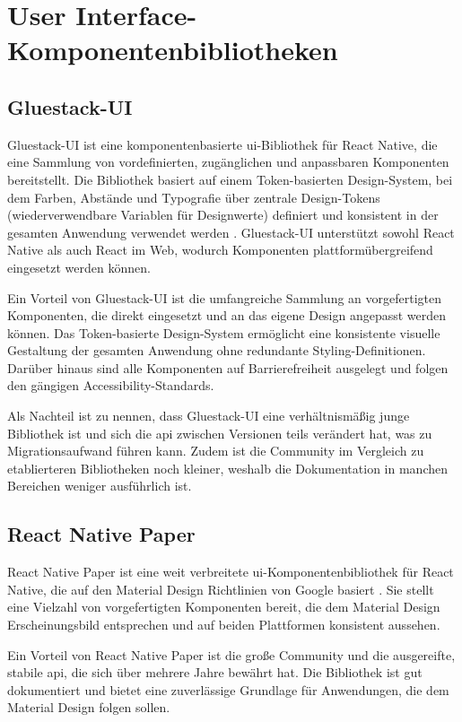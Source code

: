 \section{User Interface-Komponentenbibliotheken}

\subsection{Gluestack-UI}

Gluestack-UI ist eine komponentenbasierte \gls{ui}-Bibliothek für React 
Native, die eine Sammlung von vordefinierten, zugänglichen und 
anpassbaren Komponenten bereitstellt. Die Bibliothek basiert auf 
einem Token-basierten Design-System, bei dem Farben, Abstände und 
Typografie über zentrale Design-Tokens (wiederverwendbare Variablen für Designwerte) definiert und konsistent in 
der gesamten Anwendung verwendet werden \cite{gluestack-docs}. 
Gluestack-UI unterstützt sowohl React Native als auch React im Web, 
wodurch Komponenten plattformübergreifend eingesetzt werden können.

Ein Vorteil von Gluestack-UI ist die umfangreiche Sammlung an 
vorgefertigten Komponenten, die direkt eingesetzt und an das 
eigene Design angepasst werden können. Das Token-basierte 
Design-System ermöglicht eine konsistente visuelle Gestaltung 
der gesamten Anwendung ohne redundante Styling-Definitionen. 
Darüber hinaus sind alle Komponenten auf Barrierefreiheit 
ausgelegt und folgen den gängigen Accessibility-Standards.

Als Nachteil ist zu nennen, dass Gluestack-UI eine verhältnismäßig 
junge Bibliothek ist und sich die \gls{api} zwischen Versionen teils 
verändert hat, was zu Migrationsaufwand führen kann. 
Zudem ist die Community im Vergleich zu etablierteren Bibliotheken noch kleiner, weshalb die Dokumentation 
in manchen Bereichen weniger ausführlich ist.

\subsection{React Native Paper}

React Native Paper ist eine weit verbreitete \gls{ui}-Komponentenbibliothek 
für React Native, die auf den Material Design Richtlinien von Google 
basiert \cite{react-native-paper-docs}. Sie stellt eine Vielzahl 
von vorgefertigten Komponenten bereit, die dem Material Design 
Erscheinungsbild entsprechen und auf beiden Plattformen konsistent 
aussehen.

Ein Vorteil von React Native Paper ist die große Community und die 
ausgereifte, stabile \gls{api}, die sich über mehrere Jahre bewährt hat. 
Die Bibliothek ist gut dokumentiert und bietet eine zuverlässige 
Grundlage für Anwendungen, die dem Material Design folgen sollen.

